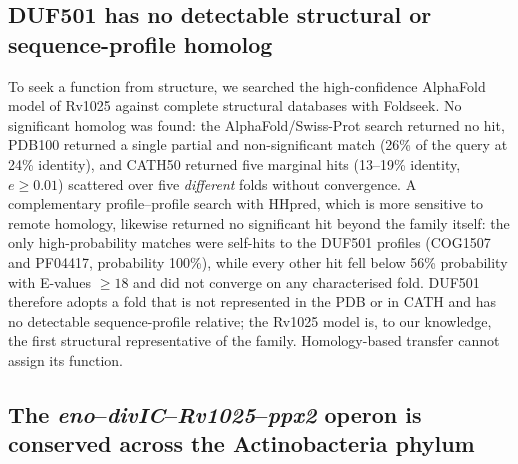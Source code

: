 \documentclass[11pt,a4paper]{article}
\begin{document}
\subsection{DUF501 has no detectable structural or sequence-profile homolog}

To seek a function from structure, we searched the high-confidence AlphaFold model of Rv1025 against complete structural databases with Foldseek. No significant homolog was found: the AlphaFold/Swiss-Prot search returned no hit, PDB100 returned a single partial and non-significant match (26\% of the query at 24\% identity), and CATH50 returned five marginal hits (13--19\% identity, $e \geq 0.01$) scattered over five \emph{different} folds without convergence. A complementary profile--profile search with HHpred, which is more sensitive to remote homology, likewise returned no significant hit beyond the family itself: the only high-probability matches were self-hits to the DUF501 profiles (COG1507 and PF04417, probability 100\%), while every other hit fell below 56\% probability with E-values $\geq 18$ and did not converge on any characterised fold. DUF501 therefore adopts a fold that is not represented in the PDB or in CATH and has no detectable sequence-profile relative; the Rv1025 model is, to our knowledge, the first structural representative of the family. Homology-based transfer cannot assign its function.

\subsection{The \textit{eno}--\textit{divIC}--\textit{Rv1025}--\textit{ppx2} operon is conserved across the Actinobacteria phylum}
\end{document}
